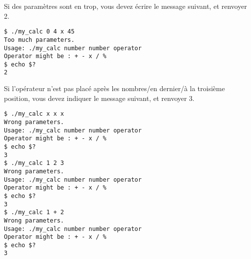 \bigskip

\noindent Si des paramètres sont en trop, vous devez écrire le message suivant, et renvoyer 2.

\bigskip

\noindent {}

\noindent {}

\noindent {}

\bigskip

\lstset{language=sh}
\begin{lstlisting}[frame=single,title={Cas d'erreur 2 : trop de paramètres}]
$ ./my_calc 0 4 x 45
Too much parameters.
Usage: ./my_calc number number operator
Operator might be : + - x / %
$ echo $?
2
\end{lstlisting}

\bigskip

\noindent Si l'opérateur n'est pas placé après les nombres/en dernier/à la troisième position, vous devez indiquer le message suivant, et renvoyer 3.

\bigskip

\noindent {}

\noindent {}

\noindent {}

\bigskip

\lstset{language=sh}
\begin{lstlisting}[frame=single,title={Cas d'erreur 3 : pas les bons paramètres}]
$ ./my_calc x x x
Wrong parameters.
Usage: ./my_calc number number operator
Operator might be : + - x / %
$ echo $?
3
$ ./my_calc 1 2 3
Wrong parameters.
Usage: ./my_calc number number operator
Operator might be : + - x / %
$ echo $?
3
$ ./my_calc 1 + 2
Wrong parameters.
Usage: ./my_calc number number operator
Operator might be : + - x / %
$ echo $?
3
\end{lstlisting}

\bigskip

